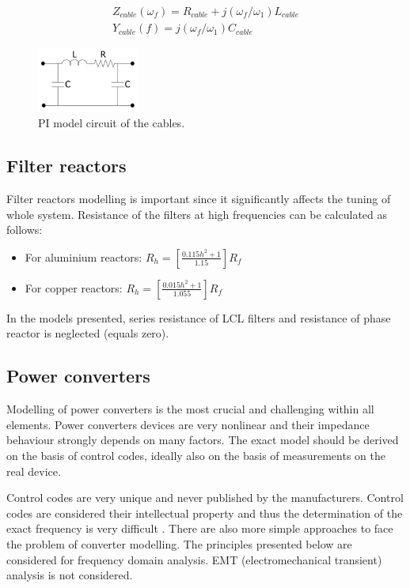 \documentclass[12pt]{report} %
\begin{document}
\begin{equation}
\begin{aligned}
	Z_{cable} (\omega_f)=R_{cable}+j(\omega_f/\omega_1 ) L_{cable}
\\
	Y_{cable} (f)=j(\omega_f/\omega_1 ) C_{cable}
\end{aligned}
\end{equation}

\begin{figure}[htb]
	\centering
    	\includegraphics[width=0.3\textwidth]{img/theory/pi_model.png}
  	\caption{PI model circuit of the cables.}
  	\label{fig:pimodel}
\end{figure}
\FloatBarrier

\subsection{Filter reactors}
Filter reactors modelling is important since it significantly affects the tuning of whole system. Resistance of the filters at high frequencies can be calculated as follows:
\begin{itemize}
	\item For aluminium reactors: $R_h=\left [ \frac{0.115h^2+1}{1.15} \right ] R_f$
	\item For copper reactors: $R_h=\left [ \frac{0.015h^2+1}{1.055} \right ] R_f$
\end{itemize}
In the models presented, series resistance of LCL filters and resistance of phase reactor is neglected (equals zero).

\subsection{Power converters} \label{sec:powerconverters}
Modelling of power converters is the most crucial and challenging within all elements. Power converters devices are very nonlinear and their impedance behaviour strongly depends on many factors. The exact model should be derived on the basis of control codes, ideally also on the basis of measurements on the real device.

Control codes are very unique and never published by the manufacturers. Control codes are considered their intellectual property and thus the determination of the exact frequency is very difficult \cite{borwin1}. There are also more simple approaches to face the problem of converter modelling. The principles presented below are considered for frequency domain analysis. EMT (electromechanical transient) analysis is not considered.
\end{document}

